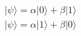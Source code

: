 \documentclass[preview]{standalone}
\begin{document}
\begin{align*}
&|\psi\rangle = \alpha  |0\rangle  + \beta  |1\rangle  \\ &|\psi\rangle = \alpha |1\rangle  + \beta |0\rangle
\end{align*}
\end{document}
